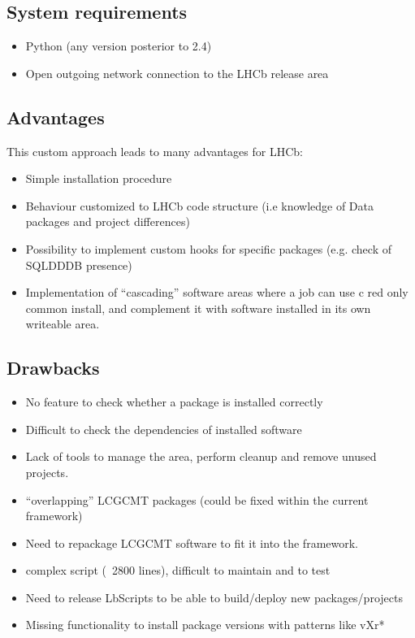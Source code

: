 \documentclass{lhcbnote}
\begin{document}
\subsection{System requirements}
\begin{itemize}
\item Python (any version posterior to  2.4)
\item Open outgoing network connection to the LHCb release area 
\end{itemize}


\subsection{Advantages}
This custom approach leads to many advantages for LHCb:
\begin{itemize}
\item Simple installation procedure
\item Behaviour customized to LHCb code structure (i.e knowledge of Data packages and project differences)
\item Possibility to implement custom hooks for specific packages (e.g. check of SQLDDDB presence)
\item Implementation of ``cascading'' software areas where a job can use c red only common install, and complement it with software installed in its own writeable area.
\end{itemize}

\subsection{Drawbacks}
\begin{itemize}
\item No feature to check whether a package is installed correctly
\item Difficult to check the dependencies of installed software
\item Lack of tools to manage the area, perform cleanup and remove unused projects.
\item ``overlapping'' LCGCMT packages (could be fixed within the current framework) 
\item Need to repackage LCGCMT software to fit it into the framework.
\item complex script (~2800 lines), difficult to maintain and to test
\item Need to release LbScripts to be able to build/deploy new packages/projects
\item Missing functionality to install package versions with patterns like vXr*
\end{itemize}
\end{document}
